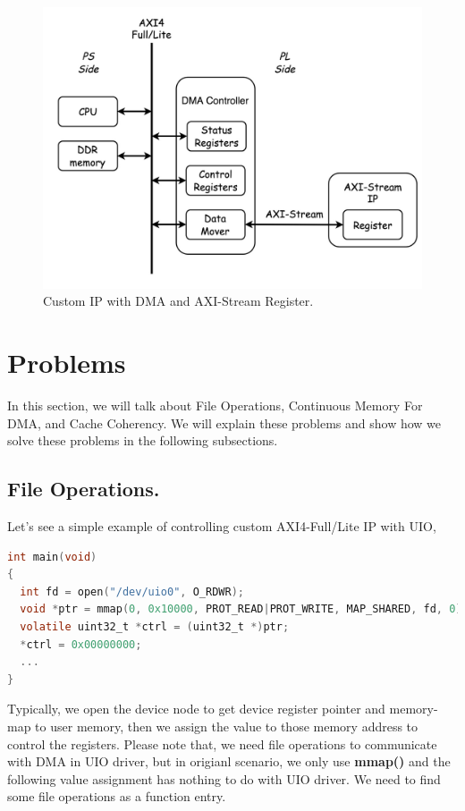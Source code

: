 \begin{figure}[!htb]
  \centering
  \includegraphics[scale=0.3]{images/customStreamIP.jpg}
  \caption[Custom IP with DMA and AXI-Stream Register.]{Custom IP with DMA and AXI-Stream Register.}
  \label{fig:Custom IP with DMA and AXI-Stream Register.}
\end{figure}
 

\section{Problems}
\label{sec:Problems}

In this section, we will talk about File Operations, Continuous Memory For DMA, and Cache Coherency. We will explain these problems and show how we solve these problems in the following subsections.

\subsection{File Operations.}
\label{subsec:File Operations}
Let's see a simple example of controlling custom AXI4-Full/Lite IP with UIO,

{\renewcommand\baselinestretch{0.8}\selectfont
\begin{lstlisting}[frame=single,language=C]
int main(void)
{
  int fd = open("/dev/uio0", O_RDWR);
  void *ptr = mmap(0, 0x10000, PROT_READ|PROT_WRITE, MAP_SHARED, fd, 0);
  volatile uint32_t *ctrl = (uint32_t *)ptr;
  *ctrl = 0x00000000;
  ...
}
\end{lstlisting}
\par}
Typically, we open the device node to get device register pointer and memory-map to user memory, then we assign the value to those memory address to control the registers. Please note that, we need file operations to communicate with DMA in UIO driver, but in origianl scenario, we only use \textbf{mmap()} and the following value assignment has nothing to do with UIO driver. We need to find some file operations as a function entry. 


